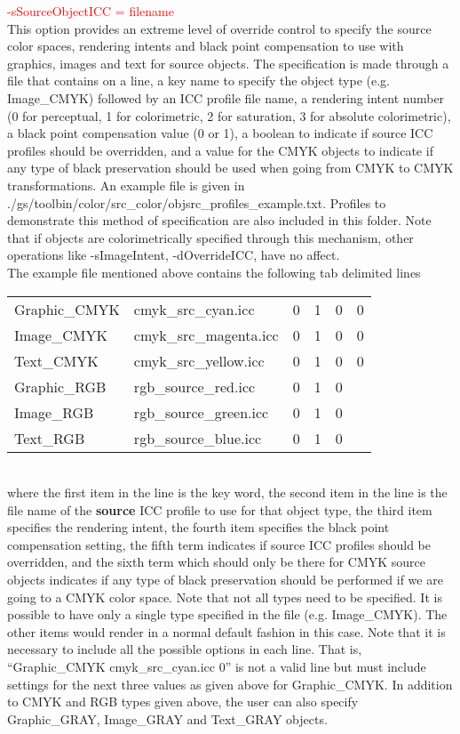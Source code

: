 \documentclass[12pt,notitlepage]{article}
\begin{document}
\textcolor{red}{-sSourceObjectICC = filename}\\

This option provides an extreme level of override control to specify the source color spaces, rendering intents and black point compensation to use with graphics, images and text for source objects. The specification is made through a file that contains on a line, a key name to specify the object type (e.g. Image\_CMYK) followed by an ICC profile file name, a rendering intent number (0 for perceptual, 1 for colorimetric, 2 for saturation, 3 for absolute colorimetric), a black point compensation value (0 or 1), a boolean to indicate if source ICC profiles should be overridden, and a value for the CMYK objects to indicate if any type of black preservation should be used when going from CMYK to CMYK transformations. An example file is given in ./gs/toolbin/color/src\_color/objsrc\_profiles\_example.txt. Profiles to demonstrate this method of specification are also included in this folder. Note that if objects are colorimetrically specified through this mechanism, other operations like -sImageIntent, -dOverrideICC, have no affect.\\

The example file mentioned above contains the following tab delimited lines\\

\begin{tabular}{llllll}
Graphic\_CMYK & cmyk\_src\_cyan.icc	& 0 & 1 & 0 & 0 \\
Image\_CMYK	& cmyk\_src\_magenta.icc &	0 & 1 & 0 & 0  \\
Text\_CMYK	& cmyk\_src\_yellow.icc	 & 0 & 1 & 0 & 0  \\
Graphic\_RGB &	rgb\_source\_red.icc	& 0 & 1 & 0 & \\
Image\_RGB &	rgb\_source\_green.icc	& 0 & 1 & 0 & \\
Text\_RGB & rgb\_source\_blue.icc & 0 & 1 & 0 & \\
\end{tabular}\\

\noindent where the first item in the line is the key word, the second item in the line is the file name of the {\bf source} ICC profile to use for that object type, the third item specifies the rendering intent, the fourth item specifies the black point compensation setting, the fifth term indicates if source ICC profiles should be overridden, and the sixth term which should only be there for CMYK source objects indicates if any type of black preservation should be performed if we are going to a CMYK color space.  Note that not all types need to be specified.  It is possible to have only a single type specified in the file (e.g. Image\_CMYK).  The other items would render in a normal default fashion in this case.  Note that it is necessary to include all the possible options in each line.    That is, ``Graphic\_CMYK  cmyk\_src\_cyan.icc 0'' is not a valid line but must include settings for the next three values as given above for Graphic\_CMYK.  In addition to CMYK and RGB types given above, the user can also specify Graphic\_GRAY, Image\_GRAY and Text\_GRAY objects.
\end{document}
